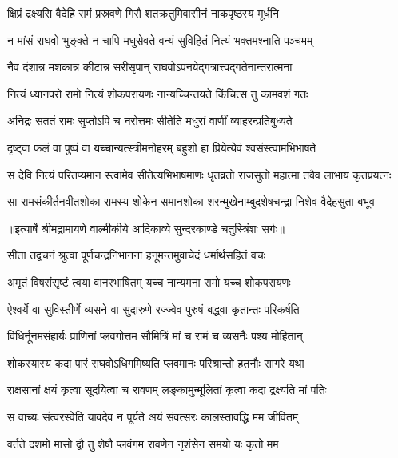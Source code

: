 \twolineshloka
{क्षिप्रं द्रक्ष्यसि वैदेहि रामं प्रस्रवणे गिरौ}
{शतक्रतुमिवासीनं नाकपृष्ठस्य मूर्धनि} %

\twolineshloka
{न मांसं राघवो भुङ्क्ते न चापि मधुसेवते}
{वन्यं सुविहितं नित्यं भक्तमश्नाति पञ्चमम्} %

\twolineshloka
{नैव दंशान्न मशकान्न कीटान्न सरीसृपान्}
{राघवोऽपनयेद्गत्रात्त्वद्गतेनान्तरात्मना} %

\twolineshloka
{नित्यं ध्यानपरो रामो नित्यं शोकपरायणः}
{नान्यच्चिन्तयते किंचित्स तु कामवशं गतः} %

\twolineshloka
{अनिद्रः सततं रामः सुप्तोऽपि च नरोत्तमः}
{सीतेति मधुरां वाणीं व्याहरन्प्रतिबुध्यते} %

\twolineshloka
{दृष्ट्वा फलं वा पुष्पं वा यच्चान्यत्स्त्रीमनोहरम्}
{बहुशो हा प्रियेत्येवं श्वसंस्त्वामभिभाषते} %

\fourlineindentedshloka
{स देवि नित्यं परितप्यमान}
{स्त्वामेव सीतेत्यभिभाषमाणः}
{धृतव्रतो राजसुतो महात्मा}
{ तवैव लाभाय कृतप्रयत्नः} %

\fourlineindentedshloka
{सा रामसंकीर्तनवीतशोका}
{ रामस्य शोकेन समानशोका}
{शरन्मुखेनाम्बुदशेषचन्द्रा}
{ निशेव वैदेहसुता बभूव} %


{॥इत्यार्षे श्रीमद्रामायणे वाल्मीकीये आदिकाव्ये सुन्दरकाण्डे चतुस्त्रिंशः सर्गः॥}


\twolineshloka
{सीता तद्वचनं श्रुत्वा पूर्णचन्द्रनिभानना}
{हनूमन्तमुवाचेदं धर्मार्थसहितं वचः} %

\twolineshloka
{अमृतं विषसंसृष्टं त्वया वानरभाषितम्}
{यच्च नान्यमना रामो यच्च शोकपरायणः} %

\twolineshloka
{ऐश्वर्ये वा सुविस्तीर्णे व्यसने वा सुदारुणे}
{रज्ज्वेव पुरुषं बद्ध्वा कृतान्तः परिकर्षति} %

\twolineshloka
{विधिर्नूनमसंहार्यः प्राणिनां प्लवगोत्तम}
{सौमित्रिं मां च रामं च व्यसनैः पश्य मोहितान्} %

\twolineshloka
{शोकस्यास्य कदा पारं राघवोऽधिगमिष्यति}
{प्लवमानः परिश्रान्तो हतनौः सागरे यथा} %

\twolineshloka
{राक्षसानां क्षयं कृत्वा सूदयित्वा च रावणम्}
{लङ्कामुन्मूलितां कृत्वा कदा द्रक्ष्यति मां पतिः} %

\twolineshloka
{स वाच्यः संत्वरस्वेति यावदेव न पूर्यते}
{अयं संवत्सरः कालस्तावद्धि मम जीवितम्} %

\twolineshloka
{वर्तते दशमो मासो द्वौ तु शेषौ प्लवंगम}
{रावणेन नृशंसेन समयो यः कृतो मम} %

